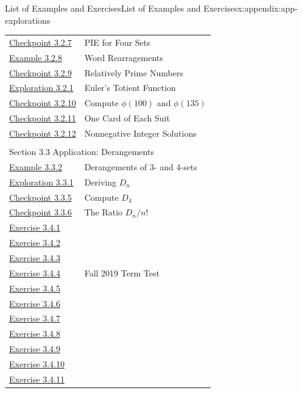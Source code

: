 \documentclass[oneside,10pt,]{book}
\numberwithin{equation}{section}
\begin{document}
\begin{appendixptx}{List of Examples and Exercises}{}{List of Examples and Exercises}{}{}{x:appendix:app-explorations}
\begin{longtable}[l]{ll}
\hyperref[x:exercise:ex-pie-4sets]{Checkpoint 3.2.7}& PIE for Four Sets\\
\hyperref[x:example:eg-pie-EQUATION]{Example 3.2.8}& Word Rearragements\\
\hyperref[x:exercise:ex-pie-relatively-prime]{Checkpoint 3.2.9}& Relatively Prime Numbers\\
\hyperref[x:exploration:expl-pie-euler-totient]{Exploration 3.2.1}& Euler's Totient Function\\
\hyperref[x:exercise:ex-pie-apply-totient]{Checkpoint 3.2.10}& Compute \(\phi(100)\) and \(\phi(135)\)\\
\hyperref[x:exercise:ex-pie-cards]{Checkpoint 3.2.11}& One Card of Each Suit\\
\hyperref[x:exercise:ex-pie-nonnegative]{Checkpoint 3.2.12}& Nonnegative Integer Solutions\\
\multicolumn{2}{l}{\null}\\[1.5ex] \multicolumn{2}{l}{\large Section 3.3 Application: Derangements}\\[0.5ex]
\hyperref[x:example:eg-derangement-34]{Example 3.3.2}& Derangements of 3- and 4-sets\\
\hyperref[x:exploration:expl-derangement-Dn]{Exploration 3.3.1}& Deriving \(D_n\)\\
\hyperref[x:exercise:ex-derangement-D4]{Checkpoint 3.3.5}& Compute \(D_4\)\\
\hyperref[x:exercise:ex-derangement-ratio]{Checkpoint 3.3.6}& The Ratio \(D_n/n!\)\\
\hyperlink{g:exercise:id429662}{Exercise 3.4.1}& \\
\hyperlink{g:exercise:id438660}{Exercise 3.4.2}& \\
\hyperlink{g:exercise:id438733}{Exercise 3.4.3}& \\
\hyperlink{g:exercise:id438707}{Exercise 3.4.4}& Fall 2019 Term Test\\
\hyperlink{g:exercise:id438923}{Exercise 3.4.5}& \\
\hyperlink{g:exercise:id438935}{Exercise 3.4.6}& \\
\hyperlink{g:exercise:id439009}{Exercise 3.4.7}& \\
\hyperlink{g:exercise:id439122}{Exercise 3.4.8}& \\
\hyperlink{g:exercise:id439181}{Exercise 3.4.9}& \\
\hyperlink{g:exercise:id439213}{Exercise 3.4.10}& \\
\hyperlink{g:exercise:id439281}{Exercise 3.4.11}& \\

\end{longtable}
\end{appendixptx}
\end{document}
